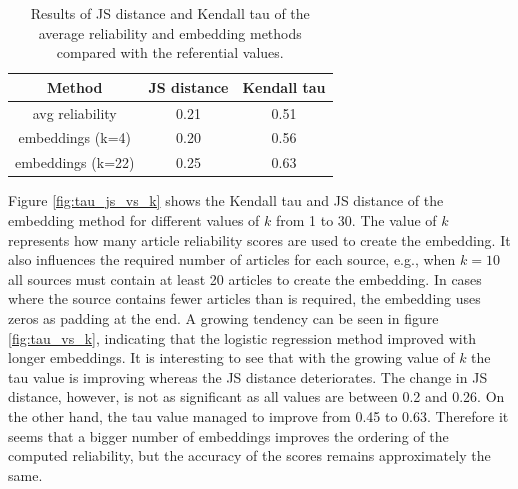 \begin{table}[H]
    \centering
\begin{tabular}{|c|c|c|}
\hline
\textbf{Method} & \textbf{JS distance} & \textbf{Kendall tau} \\ \hline
avg reliability & 0.21                 & 0.51                 \\ \hline
embeddings (k=4)      & 0.20                 & 0.56                 \\ \hline
embeddings (k=22)     & 0.25                 & 0.63                 \\ \hline
\end{tabular}
    \caption{Results of JS distance and Kendall tau of the average reliability and embedding methods compared with the referential values.}
    \label{tab:js_kt_resluts}
\end{table}

Figure \ref{fig:tau_js_vs_k} shows the Kendall tau and JS distance of the embedding method for different values of $k$ from 1 to 30. The value of $k$ represents how many article reliability scores are used to create the embedding. It also influences the required number of articles for each source, e.g., when $k=10$ all sources must contain at least 20 articles to create the embedding. In cases where the source contains fewer articles than is required, the embedding uses zeros as padding at the end. A growing tendency can be seen in figure \ref{fig:tau_vs_k}, indicating that the logistic regression method improved with longer embeddings. It is interesting to see that with the growing value of $k$ the tau value is improving whereas the JS distance deteriorates. The change in JS distance, however, is not as significant as all values are between 0.2 and 0.26. On the other hand, the tau value managed to improve from 0.45 to 0.63. Therefore it seems that a bigger number of embeddings improves the ordering of the computed reliability, but the accuracy of the scores remains approximately the same. 

